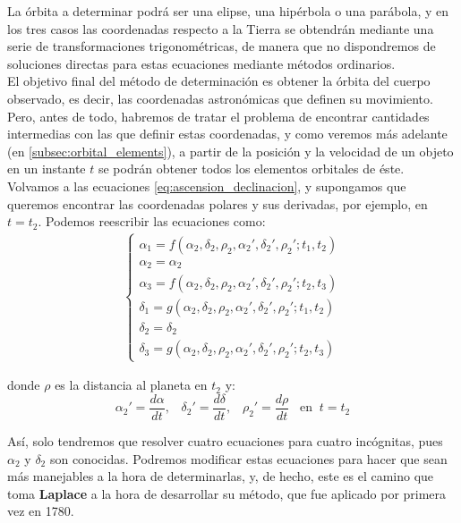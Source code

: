 La órbita a determinar podrá ser una elipse, una hipérbola o una parábola, y en los tres casos las coordenadas respecto a la Tierra se obtendrán mediante una serie de transformaciones trigonométricas, de manera que no dispondremos de soluciones directas para estas ecuaciones mediante métodos ordinarios.\\

El objetivo final del método de determinación es obtener la órbita del cuerpo observado, es decir, las coordenadas astronómicas que definen su movimiento. Pero, antes de todo, habremos de tratar el problema de encontrar cantidades intermedias con las que definir estas coordenadas, y como veremos más adelante (en \ref{subsec:orbital_elements}), a partir de la posición y la velocidad de un objeto en un instante $t$ se podrán obtener todos los elementos orbitales de éste.\\

Volvamos a las ecuaciones \eqref{eq:ascension_declinacion}, y supongamos que queremos encontrar las coordenadas polares y sus derivadas, por ejemplo, en $t=t_2$. Podemos reescribir las ecuaciones como:
\begin{align}
\left\{\begin{array}{l}
	\alpha_1 = f(\alpha_2, \delta_2, \rho_2, \alpha_2', \delta_2', \rho_2'; t_1, t_2)\\ 
	\alpha_2 = \alpha_2\\
	\alpha_3 = f(\alpha_2, \delta_2, \rho_2, \alpha_2', \delta_2', \rho_2'; t_2, t_3)\\
	\delta_1 = g(\alpha_2, \delta_2, \rho_2, \alpha_2', \delta_2', \rho_2'; t_1, t_2)\\
	\delta_2 = \delta_2\\
	\delta_3 = g(\alpha_2, \delta_2, \rho_2, \alpha_2', \delta_2', \rho_2'; t_2, t_3)
\end{array}
\right.
\label{eq:idea_laplace}
\end{align}

\noindent donde $\rho$ es la distancia al planeta en $t_2$ y:
\[
\alpha_2'=\frac{d\alpha}{dt}, \; \; \; \delta_2'=\frac{d\delta}{dt}, \; \; \; \rho_2'=\frac{d\rho}{dt} \; \; \;  \text{en} \; \; t=t_2
\]

Así, solo tendremos que resolver cuatro ecuaciones para cuatro incógnitas, pues $\alpha_2$ y $\delta_2$ son conocidas. Podremos modificar estas ecuaciones para hacer que sean más manejables a la hora de determinarlas, y, de hecho, este es el camino que toma \textbf{Laplace} a la hora de desarrollar su método, que fue aplicado por primera vez en 1780.\\

